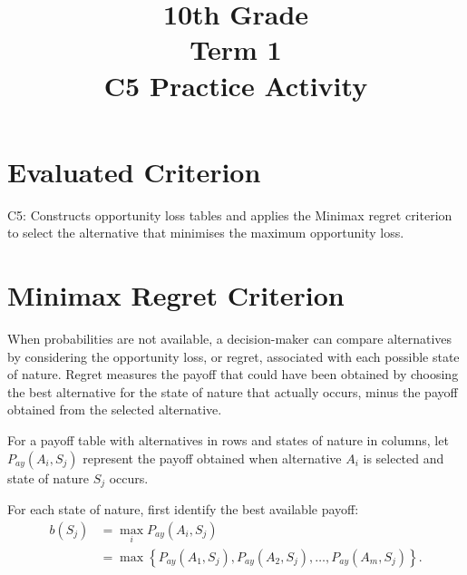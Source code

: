 \makeatletter
{}
\makeatother

%


\title{10th Grade \\ Term 1 \\ C5 Practice Activity}
\author{}
\date{}

\pagestyle{empty}


	
	\maketitle
	\vspace*{-2.5cm}
	
	
	\section*{Evaluated Criterion}
	
	C5: Constructs opportunity loss tables and applies the Minimax regret criterion to select the alternative that minimises the maximum opportunity loss.
	
	\section{Minimax Regret Criterion}
	
	When probabilities are not available, a decision-maker can compare
	alternatives by considering the opportunity loss, or regret, associated
	with each possible state of nature. Regret measures the payoff that could have been obtained by choosing the
	best alternative for the state of nature that actually occurs, minus the
	payoff obtained from the selected alternative.
	
	For a payoff table with alternatives in rows and states of nature in
	columns, let
	$
	P_{ay}(A_i,S_j)
	$
	represent the payoff obtained when alternative $A_i$ is selected and
	state of nature $S_j$ occurs.

	For each state of nature, first identify the best available payoff:
	\[
	\begin{aligned}
		b(S_j)
		&=
		\max_i P_{ay}(A_i,S_j)
		\\
		&=
		\max
		\left\{
		P_{ay}(A_1,S_j),
		P_{ay}(A_2,S_j),
		\ldots,
		P_{ay}(A_m,S_j)
		\right\}.
	\end{aligned}
	\]
	
